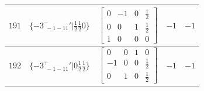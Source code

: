 \documentclass[fleqn,8pt]{jsarticle}
\begin{document}
\begin{longtable}{ccccc}
$ 191 $ & $ \{-3^{-}_{\,\,-1-11}{}'|\frac{1}{2} \frac{1}{2} 0\} $ & $ \begin{bmatrix} 0 & -1 & 0 & \frac{1}{2} \\ 0 & 0 & 1 & \frac{1}{2} \\ 1 & 0 & 0 & 0 \end{bmatrix} $ & $ -1 $ & $ -1 $ \\ \hline
$ 192 $ & $ \{-3^{+}_{\,\,-1-11}{}'|0 \frac{1}{2} \frac{1}{2}\} $ & $ \begin{bmatrix} 0 & 0 & 1 & 0 \\ -1 & 0 & 0 & \frac{1}{2} \\ 0 & 1 & 0 & \frac{1}{2} \end{bmatrix} $ & $ -1 $ & $ -1 $ \\
\end{longtable}
\end{document}
